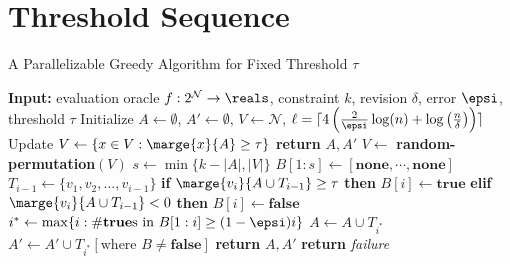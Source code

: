 \section{Threshold Sequence}
\begin{algorithm}[H]
	\caption{A Parallelizable Greedy Algorithm for Fixed Threshold $\tau$}
	\label{alg:threshold}
	\begin{algorithmic}[1]
	\State \textbf{Input:} evaluation oracle $f:2^{\mathcal N} \to \reals$, constraint $k$, revision $\delta$, error $\epsi$, threshold $\tau$
	\State Initialize $A \gets \emptyset$, $A' \gets \emptyset$, $V \gets \mathcal N$, 
	$\ell = \lceil 4\left(\frac{2}{\epsi}\log(n)+\log\left(\frac{n}{\delta}\right)\right) \rceil$ 
		\State Update $V \gets \{ x \in V : \marge{x}{A} \ge \tau \}$ \label{line:threshold-filtering}
			\State \textbf{return} $A,A'$
		\EndIf
		\State $V \gets$ \textbf{random-permutation}$(V)$ \label{line:threshold-permute}
		\State $s \gets \min \{k-|A|, |V|\}$
		\State $B[1:s] \gets [\textbf{none},\cdots,\textbf{none}]$
			\State $T_{i-1} \gets \{v_1, v_2, \ldots, v_{i-1}\}$ 
			\State \textbf{if} $ \marge{v_i}{A\cup T_{i-1}} \geq  \tau $
				\textbf{then} $B[i] \gets \textbf{true}$ \label{line:threshold-if}
			\State \textbf{elif} $ \marge{v_i}{A\cup T_{i-1}} <  0$
				\textbf{then} $B[i] \gets \textbf{false}$
		\EndFor
		\State $i^* \gets \max\{i:\# \text{\textbf{true}s in } B[1:i] \ge (1-\epsi)i\}$
		\State $A \gets A \cup T_{i^*}$
		\State $A' \gets A' \cup T_{i^*}[\text{where } B \not = \textbf{false}]$ \label{line:threshold-Aprime}
			\State \textbf{return} $A,A'$ 
		\EndIf
	\EndFor
	\State \textbf{return} \textit{failure}
	\EndProcedure
\end{algorithmic}
\end{algorithm}

